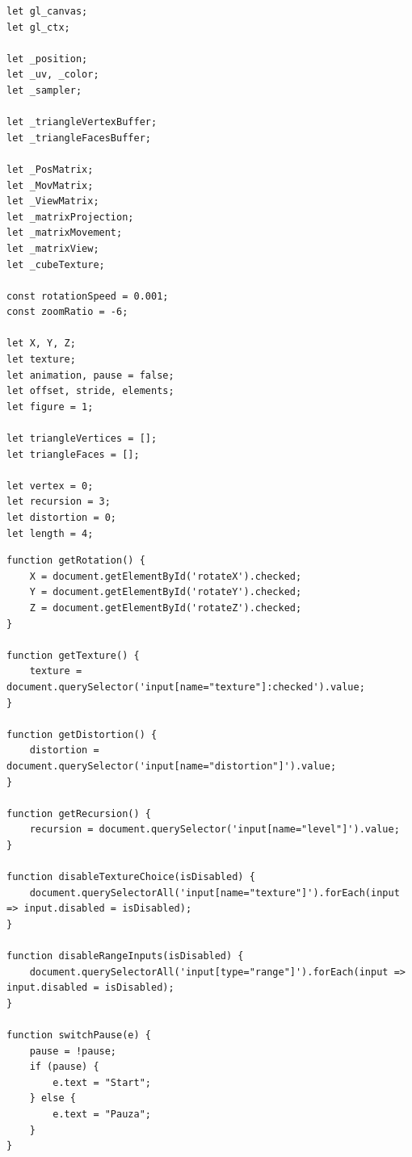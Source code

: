 \documentclass[12pt,a4paper,titlepage]{article}
\begin{document}
\begin{listing}[H]
\caption{Zmienne globalne programu}
\begin{verbatim}
let gl_canvas;
let gl_ctx;

let _position;
let _uv, _color;
let _sampler;

let _triangleVertexBuffer;
let _triangleFacesBuffer;

let _PosMatrix;
let _MovMatrix;
let _ViewMatrix;
let _matrixProjection;
let _matrixMovement;
let _matrixView;
let _cubeTexture;

const rotationSpeed = 0.001;
const zoomRatio = -6;

let X, Y, Z;
let texture;
let animation, pause = false;
let offset, stride, elements;
let figure = 1;

let triangleVertices = [];
let triangleFaces = [];

let vertex = 0;
let recursion = 3;
let distortion = 0;
let length = 4;
\end{verbatim}
\end{listing}

\begin{listing}[H]
\caption{Funkcje powiązane z inputami}
\begin{verbatim}
function getRotation() {
    X = document.getElementById('rotateX').checked;
    Y = document.getElementById('rotateY').checked;
    Z = document.getElementById('rotateZ').checked;
}

function getTexture() {
    texture = document.querySelector('input[name="texture"]:checked').value;
}

function getDistortion() {
    distortion = document.querySelector('input[name="distortion"]').value;
}

function getRecursion() {
    recursion = document.querySelector('input[name="level"]').value;
}

function disableTextureChoice(isDisabled) {
    document.querySelectorAll('input[name="texture"]').forEach(input => input.disabled = isDisabled);
}

function disableRangeInputs(isDisabled) {
    document.querySelectorAll('input[type="range"]').forEach(input => input.disabled = isDisabled);
}

function switchPause(e) {
    pause = !pause;
    if (pause) {
        e.text = "Start";
    } else {
        e.text = "Pauza";
    }
}
\end{verbatim}
\end{listing}
\end{document}
